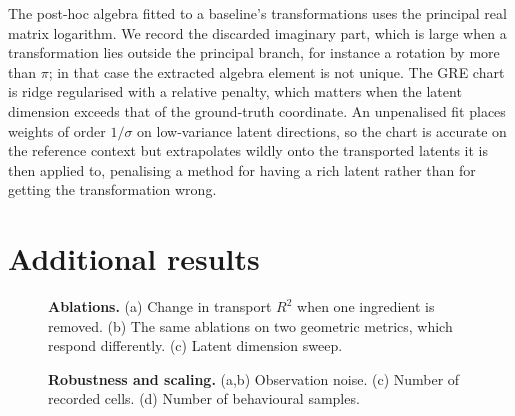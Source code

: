 The post-hoc algebra fitted to a baseline's transformations uses the principal
real matrix logarithm. We record the discarded imaginary part, which is large
when a transformation lies outside the principal branch, for instance a rotation
by more than $\pi$; in that case the extracted algebra element is not unique. The
GRE chart is ridge regularised with a relative penalty, which matters when the
latent dimension exceeds that of the ground-truth coordinate. An unpenalised fit
places weights of order $1/\sigma$ on low-variance latent directions, so the
chart is accurate on the reference context but extrapolates wildly onto the
transported latents it is then applied to, penalising a method for having a rich
latent rather than for getting the transformation wrong.

\clearpage
\section{Additional results}
\label{app:extra}

\begin{figure}[t]
  \centering
  \caption{\textbf{Ablations.} (a) Change in transport $R^2$ when one ingredient
  is removed. (b) The same ablations on two geometric metrics, which respond
  differently. (c) Latent dimension sweep.}
  \label{fig:ablations}
\end{figure}

\begin{figure}[t]
  \centering
  \caption{\textbf{Robustness and scaling.} (a,b) Observation noise. (c) Number of
  recorded cells. (d) Number of behavioural samples.}
  \label{fig:robustness}
\end{figure}







